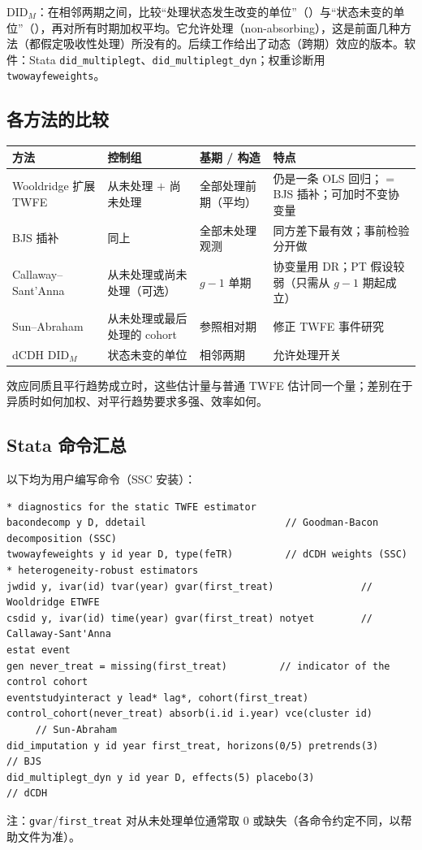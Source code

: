 $\mathrm{DID}_M$：在相邻两期之间，比较“处理状态发生改变的单位”（）与“状态未变的单位”（），再对所有时期加权平均。它允许处理（non-absorbing），这是前面几种方法（都假定吸收性处理）所没有的。后续工作给出了动态（跨期）效应的版本。软件：Stata \texttt{did\_multiplegt}、\texttt{did\_multiplegt\_dyn}；权重诊断用 \texttt{twowayfeweights}。

\subsection{各方法的比较}

\begin{center}
\small
\begin{tabularx}{\linewidth}{lLLL}
\toprule
方法 & 控制组 & 基期 / 构造 & 特点\\
\midrule
Wooldridge 扩展 TWFE & 从未处理 $+$ 尚未处理 & 全部处理前期（平均） & 仍是一条 OLS 回归；$=$ BJS 插补；可加时不变协变量\\
BJS 插补 & 同上 & 全部未处理观测 & 同方差下最有效；事前检验分开做\\
Callaway--Sant'Anna & 从未处理或尚未处理（可选） & $g-1$ 单期 & 协变量用 DR；PT 假设较弱（只需从 $g-1$ 期起成立）\\
Sun--Abraham & 从未处理或最后处理的 cohort & 参照相对期 & 修正 TWFE 事件研究\\
dCDH $\mathrm{DID}_M$ & 状态未变的单位 & 相邻两期 & 允许处理开关\\
\bottomrule
\end{tabularx}
\end{center}

效应同质且平行趋势成立时，这些估计量与普通 TWFE 估计同一个量；差别在于异质时如何加权、对平行趋势要求多强、效率如何。

\subsection{Stata 命令汇总}

以下均为用户编写命令（SSC 安装）：
\begin{lstlisting}
* diagnostics for the static TWFE estimator
bacondecomp y D, ddetail                        // Goodman-Bacon decomposition (SSC)
twowayfeweights y id year D, type(feTR)         // dCDH weights (SSC)
* heterogeneity-robust estimators
jwdid y, ivar(id) tvar(year) gvar(first_treat)               // Wooldridge ETWFE
csdid y, ivar(id) time(year) gvar(first_treat) notyet        // Callaway-Sant'Anna
estat event
gen never_treat = missing(first_treat)         // indicator of the control cohort
eventstudyinteract y lead* lag*, cohort(first_treat) control_cohort(never_treat) absorb(i.id i.year) vce(cluster id)
     // Sun-Abraham
did_imputation y id year first_treat, horizons(0/5) pretrends(3)           // BJS
did_multiplegt_dyn y id year D, effects(5) placebo(3)                     // dCDH
\end{lstlisting}
注：\texttt{gvar}/\texttt{first\_treat} 对从未处理单位通常取 0 或缺失（各命令约定不同，以帮助文件为准）。

